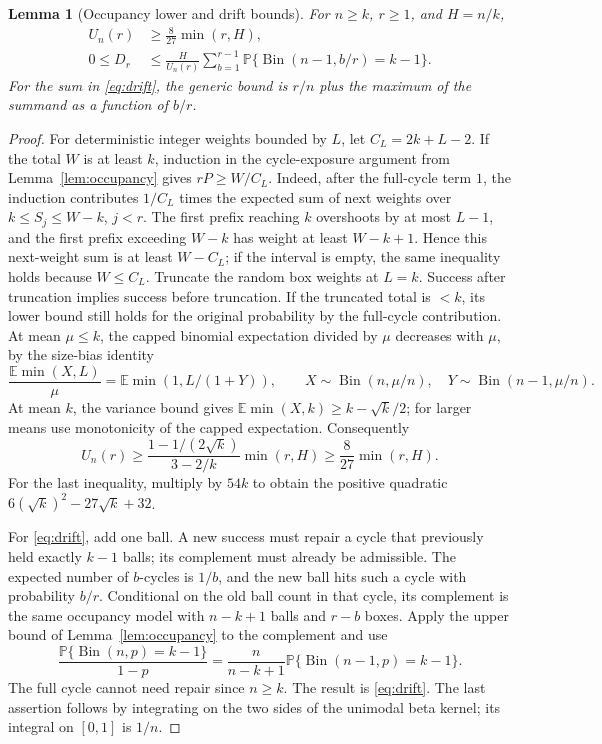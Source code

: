 \documentclass[11pt,reqno]{amsart}
\newtheorem{lemma}[theorem]{Lemma}
\theoremstyle{remark}
\newcommand{\Prob}{\mathbb{P}}
\newcommand{\Exp}{\mathbb{E}}
\newcommand{\Bin}{\operatorname{Bin}}
\begin{document}
\begin{lemma}[Occupancy lower and drift bounds]\label{lem:drift}
For $n\ge k$, $r\ge1$, and $H=n/k$,
\begin{align}
 U_n(r)&\ge \frac8{27}\min(r,H), \label{eq:occupancylower}\\
 0\le D_r&\le \frac{H}{U_n(r)}\sum_{b=1}^{r-1}
           \Prob\{\Bin(n-1,b/r)=k-1\}. \label{eq:drift}
\end{align}
For the sum in \eqref{eq:drift}, the generic bound is $r/n$ plus the maximum of the summand as a function of $b/r$.
\end{lemma}
\begin{proof}
For deterministic integer weights bounded by $L$, let $C_L=2k+L-2$. If the total $W$ is at least $k$, induction in the cycle-exposure argument from Lemma~\ref{lem:occupancy} gives $rP\ge W/C_L$. Indeed, after the full-cycle term $1$, the induction contributes $1/C_L$ times the expected sum of next weights over $k\le S_j\le W-k$, $j<r$. The first prefix reaching $k$ overshoots by at most $L-1$, and the first prefix exceeding $W-k$ has weight at least $W-k+1$. Hence this next-weight sum is at least $W-C_L$; if the interval is empty, the same inequality holds because $W\le C_L$. Truncate the random box weights at $L=k$. Success after truncation implies success before truncation. If the truncated total is $<k$, its lower bound still holds for the original probability by the full-cycle contribution. At mean $\mu\le k$, the capped binomial expectation divided by $\mu$ decreases with $\mu$, by the size-bias identity
\[
 \frac{\Exp\min(X,L)}{\mu}=\Exp\min(1,L/(1+Y)),\qquad
 X\sim\Bin(n,\mu/n),\quad Y\sim\Bin(n-1,\mu/n).
\]
At mean $k$, the variance bound gives $\Exp\min(X,k)\ge k-\sqrt{k}/2$; for larger means use monotonicity of the capped expectation. Consequently
\[
 U_n(r)\ge
 \frac{1-1/(2\sqrt{k})}{3-2/k}\min(r,H)
 \ge \frac8{27}\min(r,H).
\]
For the last inequality, multiply by $54k$ to obtain the positive quadratic $6(\sqrt{k})^2-27\sqrt{k}+32$.

For \eqref{eq:drift}, add one ball. A new success must repair a cycle that previously held exactly $k-1$ balls; its complement must already be admissible. The expected number of $b$-cycles is $1/b$, and the new ball hits such a cycle with probability $b/r$. Conditional on the old ball count in that cycle, its complement is the same occupancy model with $n-k+1$ balls and $r-b$ boxes. Apply the upper bound of Lemma~\ref{lem:occupancy} to the complement and use
\[
 \frac{\Prob\{\Bin(n,p)=k-1\}}{1-p}
   =\frac{n}{n-k+1}\Prob\{\Bin(n-1,p)=k-1\}.
\]
The full cycle cannot need repair since $n\ge k$. The result is \eqref{eq:drift}. The last assertion follows by integrating on the two sides of the unimodal beta kernel; its integral on $[0,1]$ is $1/n$.
\end{proof}
\end{document}
